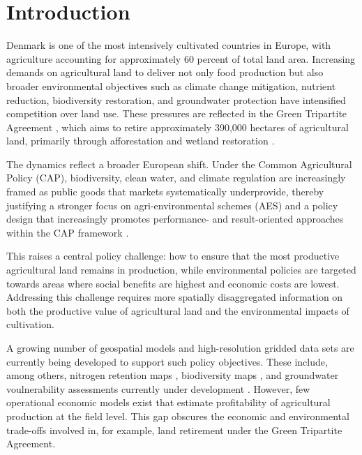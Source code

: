 \documentclass[12pt]{article}
\begin{document}
\newpage


\tableofcontents


\newpage



\section{Introduction}
\label{sec:introduction}

Denmark is one of the most intensively cultivated countries in Europe, with agriculture accounting for approximately 60 percent of total land area. 
Increasing demands on agricultural land to deliver not only food production but also broader environmental objectives such as climate change mitigation, nutrient reduction, biodiversity restoration, and groundwater protection have intensified competition over land use. 
These pressures are reflected in the Green Tripartite Agreement \citep{regeringen2024groentdanmark}, which aims to retire approximately 390,000 hectares of agricultural land, primarily through afforestation and wetland restoration \citep{regeringen2024groentdanmark}.

The dynamics reflect a broader European shift. Under the Common Agricultural Policy (CAP), biodiversity, clean water, and climate regulation are increasingly framed as public goods that markets systematically underprovide, thereby justifying a stronger focus on agri-environmental schemes  (AES) and a policy design that increasingly promotes performance- and result-oriented approaches within the CAP framework \citep{eu_ndm, eurochoices2025}.

This raises a central policy challenge: how to ensure that the most productive agricultural land remains in production, while environmental policies are targeted towards areas where social benefits are highest and economic costs are lowest. 
Addressing this challenge requires more spatially disaggregated information on both the productive value of agricultural land and the environmental impacts of cultivation.

A growing number of geospatial models and high-resolution gridded data sets are currently being developed to support such policy objectives. These include, among others, nitrogen retention maps \citep{Borgesen2020}, biodiversity maps \citep{petersen2024mere}, and groundwater voulnerability assessments currently under development \citep{miljostyrelsen_sgo}. However, few operational economic models exist that estimate profitability of agricultural production at the field level. 
This gap obscures the economic and environmental trade-offs involved in, for example, land retirement under the Green Tripartite Agreement.
\end{document}
